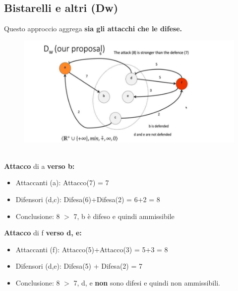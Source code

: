 \subsection{Bistarelli e altri (Dw)}
Questo approccio aggrega \textbf{sia gli attacchi che le difese.}
\begin{figure}[htp]
	\centering
    \includegraphics[width=12cm, keepaspectratio]{img/Cap6/bistarelli.png}
\end{figure}
\\\textbf{Attacco} di a \textbf{verso b:}
\begin{itemize}
    \item Attaccanti (a): Attacco(7) = 7
    \item Difensori (d,c): Difesa(6)+Difesa(2) = 6+2 = 8
    \item Conclusione: 8 $>$ 7, b è difeso e quindi ammissibile
\end{itemize}
\textbf{Attacco} di f \textbf{verso d, e:}
\begin{itemize}
    \item Attaccanti (f): Attacco(5)+Attacco(3) = 5+3 = 8
    \item Difensori (d,e): Difesa(5) + Difesa(2) = 7
    \item Conclusione: 8 $>$ 7, d, e \textbf{non} sono difesi e quindi non ammissibili.
\end{itemize}
\newpage
